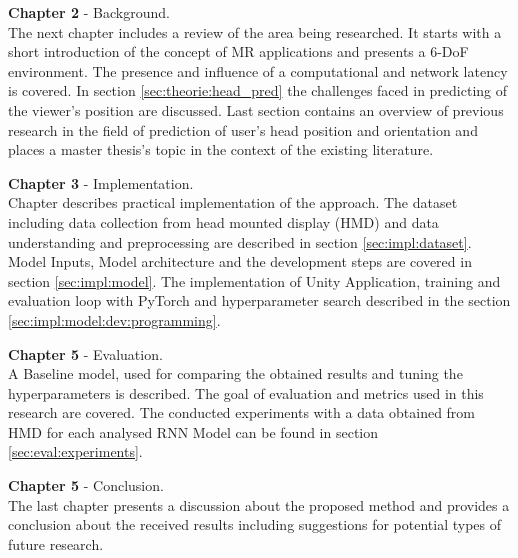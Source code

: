 \textbf{Chapter 2} - Background.\\
The next chapter includes a review of the area being researched. It starts with a short introduction of the concept of MR applications and presents a 6-DoF environment. The presence and influence of a computational and network latency is covered. In section \ref{sec:theorie:head_pred} the challenges faced in predicting of the viewer's position are discussed. Last section contains an overview of previous research in the field of prediction of user's head position and orientation and places a master thesis's topic in the context of the existing literature. 

\textbf{Chapter 3} - Implementation.\\
Chapter describes practical implementation of the approach. The dataset including data collection from head mounted display (HMD) and data understanding and preprocessing are described in section \ref{sec:impl:dataset}. Model Inputs, Model architecture and the development steps are covered in section \ref{sec:impl:model}. The implementation of Unity Application, training and evaluation loop with PyTorch and hyperparameter search described in the section \ref{sec:impl:model:dev:programming}.


\textbf{Chapter 5} - Evaluation.\\
A Baseline model, used for comparing the obtained results and tuning the hyperparameters is described. The goal of evaluation and metrics used in this research are covered. The conducted experiments with a data obtained from HMD for each analysed RNN Model can be found in section \ref{sec:eval:experiments}.

\textbf{Chapter 5} - Conclusion.\\
The last chapter presents a discussion about the proposed method and provides a conclusion about the received results including suggestions for potential types of future research.